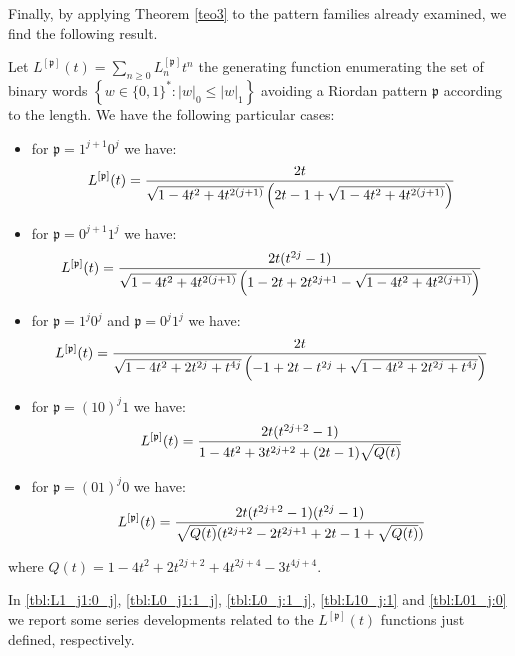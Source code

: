 Finally, by applying Theorem \ref{teo3} to the pattern families already examined, we find the following result.
\begin{coro}
\label{coroL}
Let  $L^{[\mathfrak{p}]}(t)=\sum_{n\geq 0}L_n^{[\mathfrak{p}]}t^n$ the
generating function enumerating the set of binary words $\left\lbrace w\in
\lbrace 0,1 \rbrace^{*}: |w|_0\leq |w|_1\right\rbrace$ avoiding  a Riordan
pattern $\mathfrak{p}$ according to the length. We have the following
particular cases:
\begin{itemize}

\item for $\mathfrak{p}=1^{j+1}0^j$ we have:
$$ L^{[\mathfrak{p}]}(t)={2t \over \sqrt{1-4t^2+4t^{2(j+1)}}\left(2t-1+ \sqrt{1-4t^2+4t^{2(j+1)}}\right) }$$

\item for $\mathfrak{p}=0^{j+1}1^j$ we have:
$$ L^{[\mathfrak{p}]}(t)={2t(t^{2j}-1) \over \sqrt{1-4t^2+4t^{2(j+1)}} \left(1-2t+2t^{2j+1} -\sqrt{1-4t^2+4t^{2(j+1)}}\right)}$$

\item for $\mathfrak{p}=1^{j}0^j$ and $\mathfrak{p}=0^{j}1^j$ we have:
$$ L^{[\mathfrak{p}]}(t)={2 t \over \sqrt{1-4t^2+2t^{2j}+t^{4j}} \left(-1+2t-t^{2j}+\sqrt{1-4t^{2}+2t^{2j}+t^{4j}}  \right)}$$

\item for $\mathfrak{p}=(10)^j1$ we have:
$$ L^{[\mathfrak{p}]}(t)={2 t (t^{2j+2}-1)\over 1-4t^2+3t^{2j+2}+(2t-1)\sqrt{Q(t)} }$$

\item for $\mathfrak{p}=(01)^j0$ we have:
$$ L^{[\mathfrak{p}]}(t)={2 t (t^{2j+2}-1)(t^{2j}-1)\over  \sqrt{Q(t)} (t^{2j+2}-2t^{2j+1}+2t-1+ \sqrt{Q(t)}) }$$

\end{itemize}
where $Q(t)={1-4t^2+2t^{2j+2}+4t^{2j+4}-3t^{4j+4}}$.
\end{coro}

In \autoref{tbl:L1_j1:0_j}, \autoref{tbl:L0_j1:1_j}, \autoref{tbl:L0_j:1_j},
\autoref{tbl:L10_j:1} and \autoref{tbl:L01_j:0} we report some series
developments related to the $L^{[\mathfrak{p}]}(t)$ functions just defined,
respectively.

